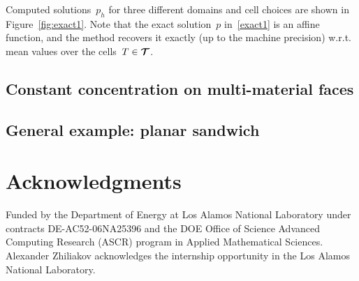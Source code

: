 Computed solutions~$p_h$ for three different domains and cell choices are shown in Figure~\ref{fig:exact1}. Note that the exact solution~$p$ in~\eqref{exact1} is an affine function, and the method recovers it exactly (up to the machine precision) w.r.t. mean values over the cells~$T \in {\boldsymbol{\mathbf{\mathcal T}}}$. 


\subsection{Constant concentration on multi-material faces}


\subsection{General example: planar sandwich}


\section*{Acknowledgments}

Funded by the Department of Energy at Los Alamos National Laboratory
under contracts DE-AC52-06NA25396 and the DOE Office of Science
Advanced Computing Research (ASCR) program in Applied Mathematical
Sciences. Alexander Zhiliakov acknowledges the internship opportunity in the Los Alamos National Laboratory.






